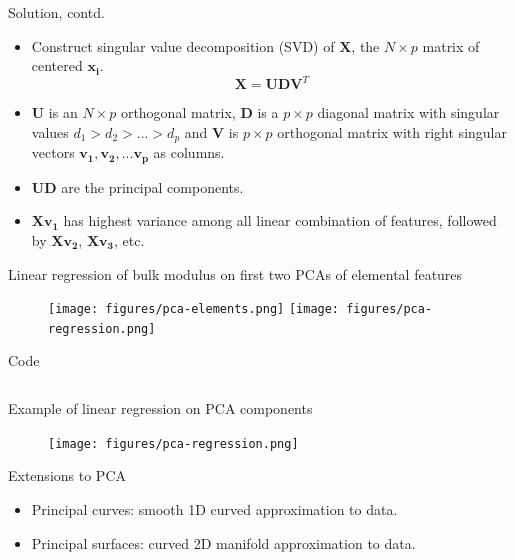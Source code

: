 \documentclass[aspectratio=169]{beamer}
\let \vec \mathbf
\begin{document}
\begin{frame}{Solution, contd.}
    \begin{itemize}
        \item Construct singular value decomposition (SVD) of $\vec{X}$, the $N \times p$ matrix of centered $\vec{x_i}$.
        \begin{equation*}
            \vec{X} = \vec{U}\vec{D}\vec{V}^T
        \end{equation*}
        \item $\vec{U}$ is an $N \times p$ orthogonal matrix, $\vec{D}$ is a $p\times p $ diagonal matrix with singular values $d_1 > d_2 > ... > d_p$ and $\vec{V}$ is $p \times p$ orthogonal matrix with right singular vectors $\vec{v_1}, \vec{v_2}, ...\vec{v_p}$ as columns.
        \item $\vec{UD}$ are the principal components. 
        \item $\vec{Xv_1}$ has highest variance among all linear combination of features, followed by $\vec{Xv_2}$, $\vec{Xv_3}$, etc.
    \end{itemize}
\end{frame} 


\begin{frame}{Linear regression of bulk modulus on first two PCAs of elemental features}
\begin{figure}
    \centering
    \texttt{[image: figures/pca-elements.png]}
    \texttt{[image: figures/pca-regression.png]}
\end{figure}
\end{frame} 


\begin{frame}[fragile]{Code}
\inputminted{python}{example_sklearn_pca.py}
\end{frame} 


\begin{frame}{Example of linear regression on PCA components}
\begin{figure}
    \centering
    \texttt{[image: figures/pca-regression.png]}
\end{figure}
\end{frame} 

\begin{frame}{Extensions to PCA}
    \begin{itemize}
        \item Principal curves: smooth 1D curved approximation to data.
        \item Principal surfaces: curved 2D manifold approximation to data.
    \end{itemize}
\end{frame}
\end{document}
